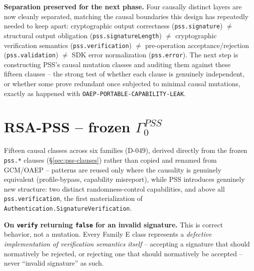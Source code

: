 \documentclass[11pt,a4paper]{article}
\begin{document}
\textbf{Separation preserved for the next phase.} Four causally distinct layers are now cleanly separated, matching the causal boundaries this design has repeatedly needed to keep apart: cryptographic output correctness (\texttt{pss.signature}) $\neq$ structural output obligation (\texttt{pss.signatureLength}) $\neq$ cryptographic verification semantics (\texttt{pss.verification}) $\neq$ pre-operation acceptance/rejection (\texttt{pss.validation}) $\neq$ SDK error normalization (\texttt{pss.error}). The next step is constructing PSS's causal mutation classes and auditing them against these fifteen clauses -- the strong test of whether each clause is genuinely independent, or whether some prove redundant once subjected to minimal causal mutations, exactly as happened with \texttt{OAEP-PORTABLE-CAPABILITY-LEAK}.

\section{RSA-PSS -- frozen \texorpdfstring{$\Gamma_0^{PSS}$}{Gamma-0 PSS}}\label{sec:pss-gamma0}
Fifteen causal classes across six families (D-049), derived directly from the frozen \texttt{pss.*} clauses (\S\ref{sec:pss-clauses}) rather than copied and renamed from GCM/OAEP -- patterns are reused only where the causality is genuinely equivalent (profile-bypass, capability misreport), while PSS introduces genuinely new structure: two distinct randomness-control capabilities, and above all \texttt{pss.verification}, the first materialization of \texttt{Authentication.SignatureVerification}.

\textbf{On \texttt{verify} returning \texttt{false} for an invalid signature.} This is correct behavior, not a mutation. Every Family E class represents a \emph{defective implementation of verification semantics itself} -- accepting a signature that should normatively be rejected, or rejecting one that should normatively be accepted -- never ``invalid signature'' as such.
\end{document}
